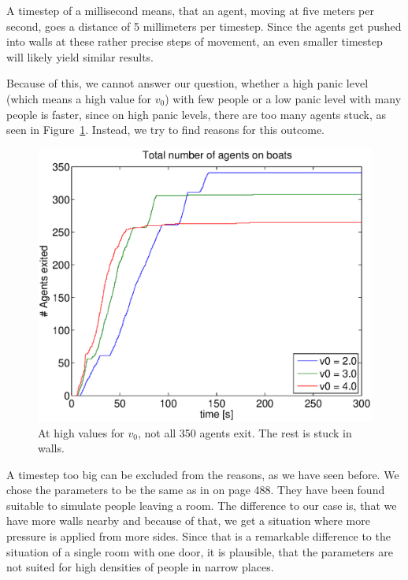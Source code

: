 \documentclass[11pt]{article}
\begin{document}
A timestep of a millisecond means, that an agent, moving at five meters per second,
goes a distance of 5 millimeters per timestep. Since the agents get pushed into walls
at these rather precise steps of movement, an even smaller timestep will likely yield similar results. 


Because of this, we cannot answer our question, whether a high panic level (which means a high value for \(v_0\))
with few people
or a low panic level with many people is faster, since on high panic levels, there are too many agents stuck, as seen in Figure~\ref{v0plotwallhang}. Instead, we try to find reasons for this outcome.

\begin{figure}[h]
	\centering
	\includegraphics[scale=0.5]{images/v0plotwallhang.eps}
	\caption{At high values for \(v_0\), not all 350 agents exit. The rest is stuck in walls.	}
	\label{v0plotwallhang}
\end{figure}

A timestep too big can be excluded from the reasons, as we have seen before.
We chose the parameters to be the same as in \cite{helbing} on page 488.
They have been found suitable to simulate people leaving a room.
The difference to our case is, that we have more walls nearby and
because of that, we get a situation where more pressure is applied from more sides. 
Since that is a remarkable difference to the situation of a single room with one door, 
it is plausible, that the parameters are not suited for high densities of people in 
narrow places. 
\end{document}
